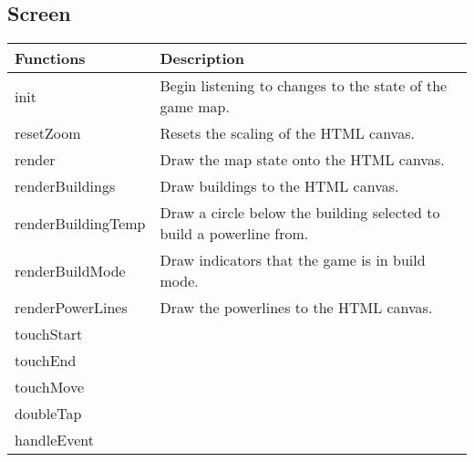 \subsection*{Screen}

	\begin{table}[H]
	\begin{tabular}{p{4cm} | p{8cm} }
	\hline
	\rowcolor{gray}
	Functions & Description \\ \hline
	init & Begin listening to changes to the state of the game map. \\ \hline
	resetZoom & Resets the scaling of the HTML canvas. \\ \hline
	render & Draw the map state onto the HTML canvas. \\ \hline
	renderBuildings & Draw buildings to the HTML canvas. \\ \hline
	renderBuildingTemp & Draw a circle below the building selected to build a powerline from. \\ \hline
	renderBuildMode & Draw indicators that the game is in build mode. \\ \hline
	renderPowerLines & Draw the powerlines to the HTML canvas. \\ \hline
  	touchStart & \\ \hline
  	touchEnd & \\ \hline
  	touchMove & \\ \hline
  	doubleTap & \\ \hline
  	handleEvent & \\ \hline
	\end{tabular}
	\end{table}

